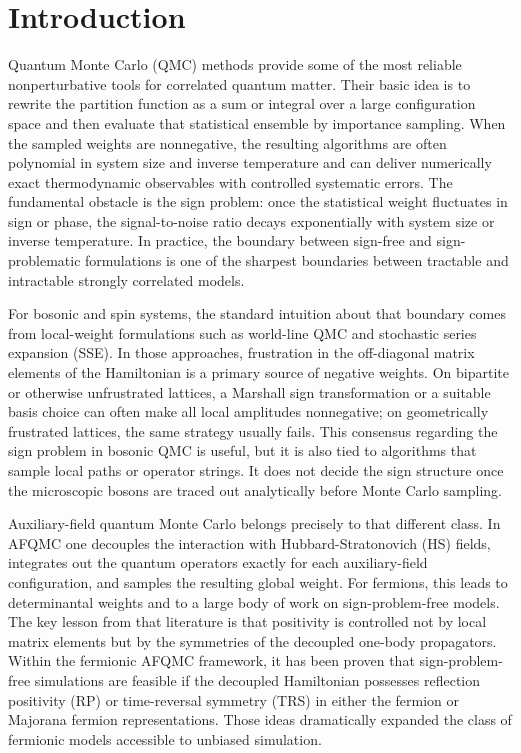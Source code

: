 \documentclass[twocolumn,aps,prb,10pt,amsmath,amssymb,amsthm,superscriptaddress]{revtex4-2}
\theoremstyle{remark}
\begin{document}
\maketitle

\section{Introduction}

Quantum Monte Carlo (QMC) methods provide some of the most reliable nonperturbative tools for correlated quantum matter. Their basic idea is to rewrite the partition function as a sum or integral over a large configuration space and then evaluate that statistical ensemble by importance sampling. When the sampled weights are nonnegative, the resulting algorithms are often polynomial in system size and inverse temperature and can deliver numerically exact thermodynamic observables with controlled systematic errors. The fundamental obstacle is the sign problem: once the statistical weight fluctuates in sign or phase, the signal-to-noise ratio decays exponentially with system size or inverse temperature. In practice, the boundary between sign-free and sign-problematic formulations is one of the sharpest boundaries between tractable and intractable strongly correlated models.

For bosonic and spin systems, the standard intuition about that boundary comes from local-weight formulations such as world-line QMC and stochastic series expansion (SSE). In those approaches, frustration in the off-diagonal matrix elements of the Hamiltonian is a primary source of negative weights. On bipartite or otherwise unfrustrated lattices, a Marshall sign transformation or a suitable basis choice can often make all local amplitudes nonnegative; on geometrically frustrated lattices, the same strategy usually fails. This consensus regarding the sign problem in bosonic QMC is useful, but it is also tied to algorithms that sample local paths or operator strings. It does not decide the sign structure once the microscopic bosons are traced out analytically before Monte Carlo sampling.

Auxiliary-field quantum Monte Carlo belongs precisely to that different class. In AFQMC one decouples the interaction with Hubbard-Stratonovich (HS) fields, integrates out the quantum operators exactly for each auxiliary-field configuration, and samples the resulting global weight. For fermions, this leads to determinantal weights and to a large body of work on sign-problem-free models. 
The key lesson from that literature is that positivity is controlled not by local matrix elements but by the symmetries of the decoupled one-body propagators. Within the fermionic AFQMC framework, it has been proven that sign-problem-free simulations are feasible if the decoupled Hamiltonian possesses reflection positivity (RP) or time-reversal symmetry (TRS) in either the fermion or Majorana fermion representations. Those ideas dramatically expanded the class of fermionic models accessible to unbiased simulation.
\end{document}
